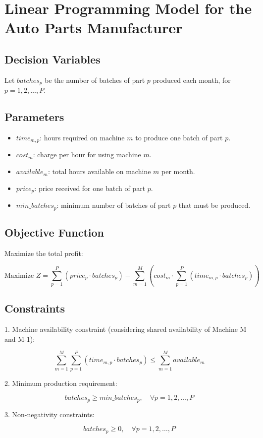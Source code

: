 \documentclass{article}
\begin{document}
\section*{Linear Programming Model for the Auto Parts Manufacturer}

\subsection*{Decision Variables}
Let \( batches_{p} \) be the number of batches of part \( p \) produced each month, for \( p = 1, 2, \ldots, P \).

\subsection*{Parameters}
\begin{itemize}
    \item \( time_{m,p} \): hours required on machine \( m \) to produce one batch of part \( p \).
    \item \( cost_{m} \): charge per hour for using machine \( m \).
    \item \( available_{m} \): total hours available on machine \( m \) per month.
    \item \( price_{p} \): price received for one batch of part \( p \).
    \item \( min\_batches_{p} \): minimum number of batches of part \( p \) that must be produced.
\end{itemize}

\subsection*{Objective Function}
Maximize the total profit:

\[
\text{Maximize } Z = \sum_{p=1}^{P} (price_{p} \cdot batches_{p}) - \sum_{m=1}^{M} \left( cost_{m} \cdot \sum_{p=1}^{P} (time_{m,p} \cdot batches_{p}) \right)
\]

\subsection*{Constraints}
1. Machine availability constraint (considering shared availability of Machine M and M-1):

\[
\sum_{m=1}^{M} \sum_{p=1}^{P} (time_{m,p} \cdot batches_{p}) \leq \sum_{m=1}^{M} available_{m}
\]

2. Minimum production requirement:

\[
batches_{p} \geq min\_batches_{p}, \quad \forall p = 1, 2, \ldots, P
\]

3. Non-negativity constraints:

\[
batches_{p} \geq 0, \quad \forall p = 1, 2, \ldots, P
\]
\end{document}
